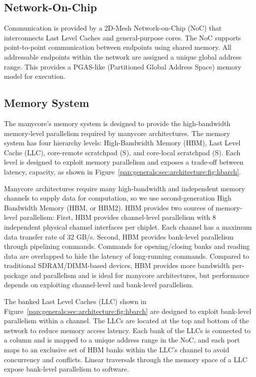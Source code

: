 \subsection{Network-On-Chip}
Communication is provided by a 2D-Mesh Network-on-Chip (NoC) that
interconnects Last Level Caches and general-purpose cores. The
NoC supports point-to-point communication between endpoints using
shared memory. All addressable endpoints within the network are
assigned a unique global address range. This provides a PGAS-like
(Partitioned Global Address Space) memory model for execution.

\subsection{Memory System}
The manycore's memory system is designed to provide the high-bandwidth memory-level parallelism required by manycore
architectures. The memory system has four hierarchy levels:
High-Bandwidth Memory (HBM), Last Level Cache (LLC), core-remote
scratchpad (S), and core-local scratchpad (S). Each level is designed
to exploit memory parallelism and exposes a trade-off between latency,
capacity, as shown in
Figure~\ref{pap:generals:sec:architecture:fig:hbarch}.

Manycore architectures require many high-bandwidth and independent
memory channels to supply data for computation, so we use
second-generation High Bandwidth Memory (HBM, or HBM2). HBM provides
two sources of memory-level parallelism: First, HBM provides
channel-level parallelism with 8 independent physical channel
interfaces per chiplet. Each channel has a maximum data transfer rate of 32
GB/s. Second, HBM provides bank-level parallelism through pipelining
commands. Commands for opening/closing banks and reading data are
overlapped to hide the latency of long-running commands. Compared to
traditional SDRAM/DIMM-based devices, HBM provides more bandwidth
per-package and parallelism and is ideal for manycore
architectures, but performance depends on exploiting channel-level and
bank-level parallelism.

The banked Last Level Caches (LLC) shown in 
Figure~\ref{pap:generals:sec:architecture:fig:hbarch} are designed
to exploit bank-level parallelism within a channel. The LLCs are located at the top and bottom of the network to reduce memory access latency.
Each bank of the LLCs is connected
to a column and is mapped to a unique address range in the NoC, and
each port maps to an exclusive set of HBM banks within the LLC's
channel to avoid concurrency and conflicts. Linear traversals through
the memory space of a LLC expose bank-level parallelism to software.

